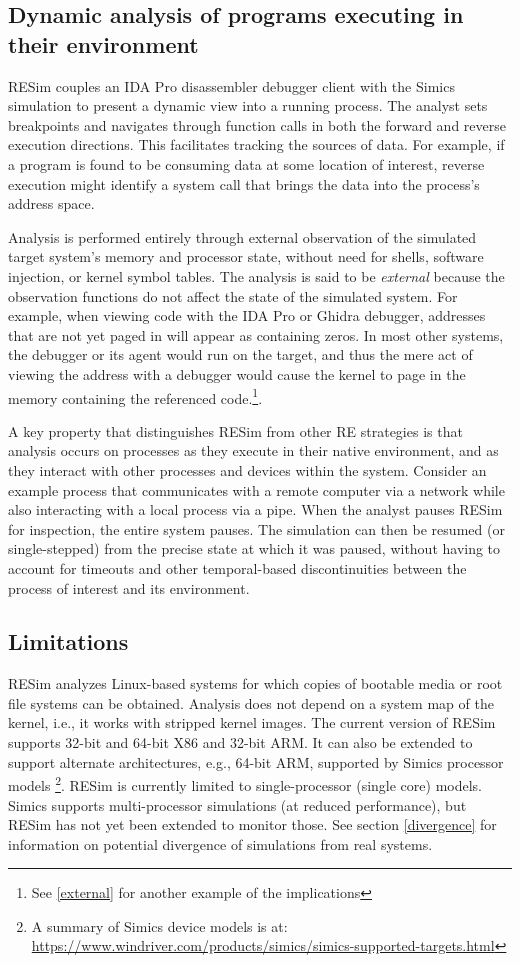 \documentclass[titlepage]{article}
\begin{document}
\subsection{Dynamic analysis of programs executing in their environment}
RESim couples an IDA Pro disassembler debugger client with the Simics simulation to present a dynamic view into a running process.  The analyst sets breakpoints and navigates through function calls in both the forward and reverse execution directions.  This facilitates tracking the sources of data.  For example, if a program is found to be consuming data at some location of interest, reverse execution might identify a system call that brings the data into the process’s address space.

Analysis is performed entirely through external observation of the simulated target system's memory and processor state, 
without need for shells, software injection, or kernel symbol tables.   The analysis is said to be \textit{external} because the observation functions do
not affect the state of the simulated system.  For example, when viewing code with the IDA Pro or Ghidra debugger, addresses that are not yet paged in will appear as containing zeros.
In most other systems, the debugger or its agent would run on the target, and thus the mere act of viewing the address with a debugger 
would cause the kernel to page
in the memory containing the referenced code.\footnote{See \ref{external} for another example of the implications}.

A key property that distinguishes RESim from other RE strategies is that analysis occurs on processes as they execute in their native environment, and as they interact with other processes and devices within the system.  Consider an example process that communicates with a remote computer via a network while also interacting with a local process via a pipe.  When the analyst pauses RESim for inspection, the entire system pauses.  The simulation can then be resumed (or single-stepped) from the precise state at which it was paused, without having to account for timeouts and other temporal-based discontinuities between the process of interest and its environment.

\subsection{Limitations}
RESim analyzes Linux-based systems for which copies of bootable media or root file systems can be obtained.  Analysis does not depend on a system map of the kernel, i.e., it works with stripped kernel images.  The current version of RESim supports 32-bit and 64-bit X86 and 32-bit ARM.  It can also be 
extended to support alternate architectures, e.g., 64-bit ARM, supported by Simics processor models \footnote{A summary of Simics device models is at: \url{https://www.windriver.com/products/simics/simics-supported-targets.html}}.  RESim is currently limited to single-processor (single core) models.  Simics supports
multi-processor simulations (at reduced performance), but RESim has not yet been extended to monitor those.
See section \ref{divergence} for information on potential divergence of simulations from real systems.
\end{document}
